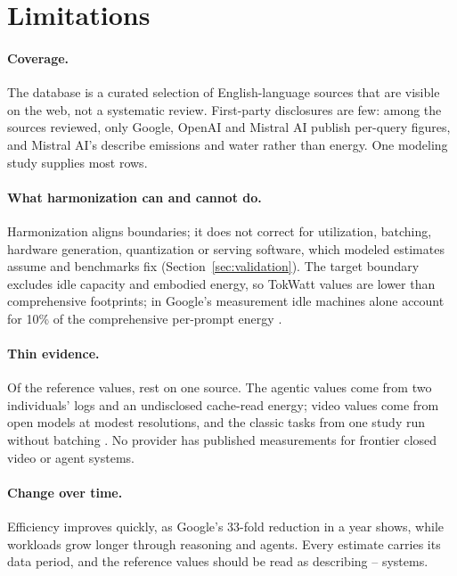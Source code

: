 \documentclass[11pt]{article}
\begin{document}
\section{Limitations}
\label{sec:limitations}

\paragraph{Coverage.}
The database is a curated selection of English-language sources that are visible on the web, not a systematic review. First-party disclosures are few: among the sources reviewed, only Google, OpenAI and Mistral AI publish per-query figures, and Mistral AI's describe emissions and water rather than energy. One modeling study supplies most rows.

\paragraph{What harmonization can and cannot do.}
Harmonization aligns boundaries; it does not correct for utilization, batching, hardware generation, quantization or serving software, which modeled estimates assume and benchmarks fix (Section~\ref{sec:validation}). The target boundary excludes idle capacity and embodied energy, so TokWatt values are lower than comprehensive footprints; in Google's measurement idle machines alone account for 10\% of the comprehensive per-prompt energy \citep{elsworth2025measuring}.

\paragraph{Thin evidence.}
Of the \nTasksRef{} reference values, \nSingleSource{} rest on one source. The agentic values come from two individuals' logs and an undisclosed cache-read energy; video values come from open models at modest resolutions, and the classic tasks from one study run without batching \citep{luccioni2024power}. No provider has published measurements for frontier closed video or agent systems.

\paragraph{Change over time.}
Efficiency improves quickly, as Google's 33-fold reduction in a year shows, while workloads grow longer through reasoning and agents. Every estimate carries its data period, and the reference values should be read as describing \yearMin--\yearMax{} systems.
\end{document}
